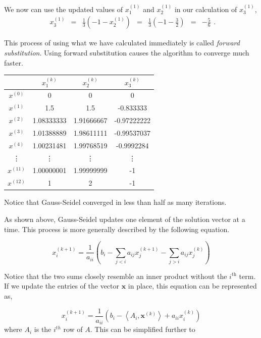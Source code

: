 We now can use the updated values of $x^{(1)}_1$ and $x^{(1)}_2$ in our
calculation of $x^{(1)}_3$,
$$
\begin{matrix}
x^{(1)}_3 & = & \frac{1}{3} ( -1 - x^{(1)}_2)       & = & \frac{1}{3} (-1 - \frac{3}{2})    & = & -\frac{5}{6}
\end{matrix}.
$$

This process of using what we have calculated immediately is called
\emph{forward substitution}. Using forward substitution causes the algorithm to
converge much faster.

\begin{center}
    \begin{tabular} {c | c c c}
        & $x^{(k)}_1$ & $x^{(k)}_2$ & $x^{(k)}_3$ \\
        \hline
          $x^{(0)}$ & 0 & 0 & 0 \\
          $x^{(1)}$ & 1.5 & 1.5 & -0.833333 \\
          $x^{(2)}$ & 1.08333333 & 1.91666667 & -0.97222222 \\
          $x^{(3)}$ & 1.01388889 & 1.98611111 & -0.99537037 \\
          $x^{(4)}$ & 1.00231481 & 1.99768519 & -0.9992284 \\
          \vdots    & \vdots    & \vdots     & \vdots     \\
          $x^{(11)}$ & 1.00000001 & 1.99999999 & -1 \\
          $x^{(12)}$ & 1 & 2 & -1 \\
        \end{tabular}
\end{center}
Notice that Gauss-Seidel converged in less than half as many iterations.

As shown above, Gauss-Seidel updates one element of the solution vector at a time.
This process is more generally described by the following equation.

\begin{equation} \label{eq:gauss_seidel_full}
x^{(k+1)}_i = \frac{1}{a_{ii}} \left (b_i - \sum_{j < i}a_{ij}x^{(k+1)}_j - \sum_{j > i}a_{ij}x^{(k)}_j \right )
\end{equation}

Notice that the two sums closely resemble an inner product without the
$i^{\text{th}}$ term. If we update the entries of the vector $\mathbf{x}$ in place,
this equation can be represented as,

$$
x^{(k+1)}_i = \frac{1}{a_{ii}} \left ( b_i - \left < A_i, \mathbf{x}^{(k)} \right > + a_{ii}x^{(k)}_i \right )
$$
where $A_i$ is the $i^{th}$ row of $A$. This can be simplified further to

